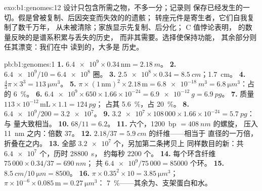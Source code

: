 \begin{solution}{exo:b1:genomes:12}
设计只包含所需之物，不多一分；记录则
保存已经发生的一切。假是曾被复制、后因突变而失效的的遗骸；
转座元件是寄生者，它们自我复制了数千万年，
从未被清除；家族显示先复制、后分化；
C 值悖论表明， 的数量反映的是谱系积累与丢失的历史，
而非其需要。选择使保持功能，
其余部分则任其漂变：我们在中
读到的，大多是
历史。
\end{solution}

\begin{solution}{pb:b1:genomes:1}
\textbf{1.} $\num{6.4e9}\times 0.34\,\mathrm{nm} = \qty{2.18}{m}$。
\textbf{2.} $\num{6.4e9}/10 = \num{6.4e8}$ 圈。
\textbf{3.} $\num{2.5e8}\times 0.34 = \qty{8.5}{cm}$；\qty{1.7}{cm}。
\textbf{4.} $\frac{4}{3}\pi\times 3^3 = \qty{113}{\micro m^3}$。
\textbf{5.} $\pi\times(1\,\mathrm{nm})^2\times 2.18\,\mathrm{m} =
\qty{6.8e-18}{m^3} = \qty{6.8}{\micro m^3}$：占的 \qty{6}{\%}。
\textbf{6.} $\num{6.4e9}\times 650\times 1.66\times 10^{-24} =
\qty{6.9e-12}{g} = \qty{6.9}{pg}$。
\textbf{7.} 质量 $113\times 10^{-12}\,\mathrm{mL}\times 1.1 =
\qty{124}{pg}$； 占其 \qty{5.6}{\%}，占 \qty{20}{\%}。
\textbf{8.} $\num{6.4e9}/200 = \num{3.2e7}$。
\textbf{9.} $\num{3.2e7}\times 108\,000\times 1.66\times 10^{-24} =
\qty{5.7}{pg}$：与  量大致相当。
\textbf{10.} $68/11 = 6.2$。
\textbf{11.} 六个，\qty{1200}{bp} $= \qty{408}{nm}$ 的螺旋，
压入 \qty{11}{nm} 之内：倍数 $37$。
\textbf{12.} $2.18/37 = \qty{5.9}{cm}$ 的纤维——相当于
直径的一万倍，折叠在之内。
\textbf{13.} 全部 $\num{3.2e7}$ 个，另加第二条拷贝上
同样数目的新：共 $\num{6.4e7}$ 个，历时 \qty{28800}{s}，
约每秒 \num{2200} 个。
\textbf{14.} 每个环含纤维 $75\,000\times 0.34/37 = \qty{690}{nm}$；
共 $\num{6.4e9}/75\,000 = \num{85000}$ 个环。
\textbf{15.} $\qty{8.5}{cm}/\qty{10}{\micro m} = 8500$。
\textbf{16.} $\pi\times 0.35^2\times 10 = \qty{3.85}{\micro m^3}$；
$\pi\times 10^{-6}\times 0.085\,\mathrm{m} = \qty{0.27}{\micro m^3}$：
\qty{7}{\%}——其余为、支架蛋白和水。

\end{solution}
